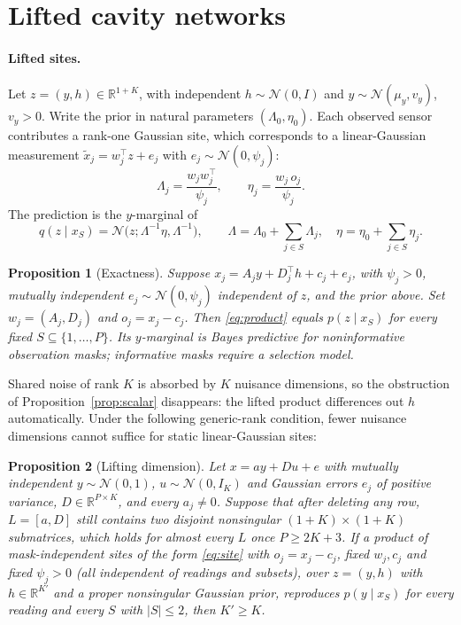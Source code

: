 \documentclass{article}
\newtheorem{proposition}{Proposition}
\newcommand{\R}{\mathbb{R}}
\newcommand{\N}{\mathcal{N}}
\begin{document}
\section{Lifted cavity networks}
\label{sec:method}



\paragraph{Lifted sites.}
Let $z=(y,h)\in\R^{1+K}$, with independent $h\sim\N(0,I)$ and $y\sim\N(\mu_y,v_y)$, $v_y>0$.
Write the prior in natural parameters $(\Lambda_0,\eta_0)$. Each observed sensor contributes a
rank-one Gaussian site, which corresponds to a linear-Gaussian measurement $\tilde x_j=w_j^\top z+e_j$ with
$e_j\sim\N(0,\psi_j)$:
\begin{equation}
  \Lambda_j=\frac{w_jw_j^\top}{\psi_j},\qquad \eta_j=\frac{w_j\,o_j}{\psi_j}.
  \label{eq:site}
\end{equation}
The prediction is the $y$-marginal of
\begin{equation}
  q(z\mid x_S)=\N\!\big(z;\Lambda^{-1}\eta,\Lambda^{-1}\big),\qquad
  \Lambda=\Lambda_0+\textstyle\sum_{j\in S}\Lambda_j,\quad \eta=\eta_0+\textstyle\sum_{j\in S}\eta_j .
  \label{eq:product}
\end{equation}

\begin{proposition}[Exactness]\label{prop:exact}
Suppose $x_j=A_jy+D_j^\top h+c_j+e_j$, with $\psi_j>0$, mutually independent $e_j\sim\N(0,\psi_j)$ independent of $z$, and the prior above. Set $w_j=(A_j,D_j)$
and $o_j=x_j-c_j$. Then \eqref{eq:product} equals $p(z\mid x_S)$ for every fixed $S\subseteq\{1,\dots,P\}$.
Its $y$-marginal is Bayes predictive for noninformative observation masks; informative masks require a selection model.
\end{proposition}

Shared noise of rank $K$ is absorbed by $K$ nuisance dimensions, so the obstruction of
Proposition~\ref{prop:scalar} disappears: the lifted product differences out $h$ automatically. Under the following
generic-rank condition, fewer nuisance dimensions cannot suffice for static linear-Gaussian sites:

\begin{proposition}[Lifting dimension]\label{prop:rank}
Let $x=ay+Du+e$ with mutually independent $y\sim\N(0,1)$, $u\sim\N(0,I_K)$ and Gaussian errors $e_j$ of positive variance, $D\in\R^{P\times K}$, and every $a_j\neq0$. Suppose
that after deleting any row, $L=[a,D]$ still contains two disjoint nonsingular $(1+K)\times(1+K)$ submatrices, which
holds for almost every $L$ once $P\geq2K+3$. If a product of mask-independent sites of the form \eqref{eq:site} with
$o_j=x_j-c_j$, fixed $w_j,c_j$ and fixed $\psi_j>0$ (all independent of readings and subsets), over $z=(y,h)$ with $h\in\R^{K'}$ and a proper nonsingular Gaussian prior, reproduces $p(y\mid x_S)$ for every reading and every $S$ with $|S|\leq2$, then $K'\geq K$.
\end{proposition}
\end{document}
